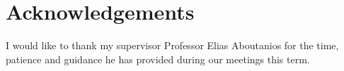\chapter*{Acknowledgements}\label{ack}
I would like to thank my supervisor Professor Elias Aboutanios for the time, patience and guidance he has provided during our meetings this term.